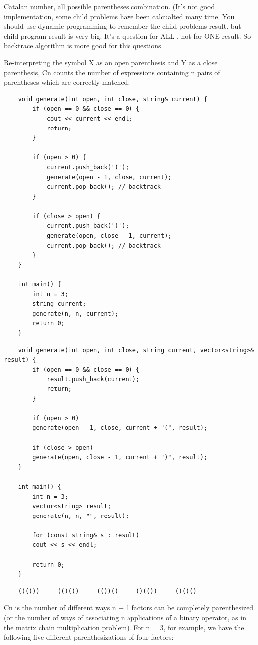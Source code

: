 \documentclass[a4paper,11pt,twoside]{book}
\begin{document}
\par Catalan number, all possible parentheses combination. (It's not good implementation, some child problems have been calcualted many time.  You should use dynamic programming to remember the child problems result. but child program result is very big.  It's a question for ALL , not for ONE result. So backtrace algorithm is more good for this questions. 

\par Re-interpreting the symbol X as an open parenthesis and Y as a close parenthesis, Cn counts the number of expressions containing n pairs of parentheses which are correctly matched:

\begin{lstlisting}
	void generate(int open, int close, string& current) {
		if (open == 0 && close == 0) {
			cout << current << endl;
			return;
		}
		
		if (open > 0) {
			current.push_back('(');
			generate(open - 1, close, current);
			current.pop_back(); // backtrack
		}
		
		if (close > open) {
			current.push_back(')');
			generate(open, close - 1, current);
			current.pop_back(); // backtrack
		}
	}
	
	int main() {
		int n = 3;
		string current;
		generate(n, n, current);
		return 0;
	}
\end{lstlisting}	


\begin{lstlisting}
	void generate(int open, int close, string current, vector<string>& result) {
		if (open == 0 && close == 0) {
			result.push_back(current);
			return;
		}
		
		if (open > 0)
		generate(open - 1, close, current + "(", result);
		
		if (close > open)
		generate(open, close - 1, current + ")", result);
	}
	
	int main() {
		int n = 3;
		vector<string> result;
		generate(n, n, "", result);
		
		for (const string& s : result)
		cout << s << endl;
		
		return 0;
	}
\end{lstlisting}	

\begin{lstlisting}
	((()))     (()())     (())()     ()(())     ()()()
\end{lstlisting}	

Cn is the number of different ways n + 1 factors can be completely parenthesized (or the number of ways of associating n applications of a binary operator, as in the matrix chain multiplication problem). For n = 3, for example, we have the following five different parenthesizations of four factors:
\end{document}
